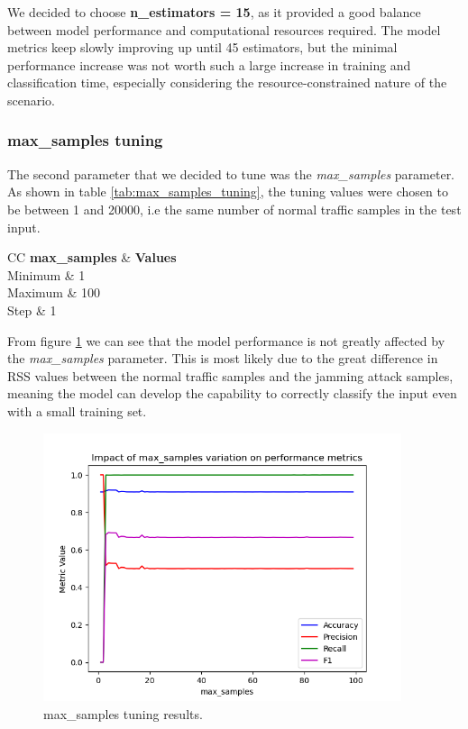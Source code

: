 \documentclass[futureinternet,article,submit,pdftex,moreauthors]{Definitions/mdpi}
\begin{document}
We decided to choose \textbf{n\_estimators = 15}, as it provided a good balance between model performance and computational resources required.
The model metrics keep slowly improving up until 45 estimators, but the minimal performance increase was not worth such a large increase in training and classification time, especially considering the resource-constrained nature of the scenario. 

\subsubsection{max\_samples tuning}

The second parameter that we decided to tune was the \textit{max\_samples} parameter. As shown in table \ref{tab:max_samples_tuning}, the tuning values were chosen to be between 1 and 20000, i.e the same number of normal traffic samples in the test input. 

\begin{table}[H]
	\caption{max\_samples tuning values.}\label{tab:max_samples_tuning}
	\begin{tabularx}{\textwidth}{CC}
	\toprule
	\textbf{max\_samples} & \textbf{Values} \\
	\midrule
	Minimum & 1 \\
	Maximum & 100 \\
	Step & 1 \\
	\bottomrule
\end{tabularx}
\end{table}

From figure \ref{fig:max_samples_tuning} we can see that the model performance is not greatly affected by the \textit{max\_samples} parameter. This is most likely due to the great difference in RSS values between the normal traffic samples and the jamming attack samples, meaning the model can develop the capability to correctly classify the input even with a small training set.

\begin{figure}[H]
	\includegraphics[width=10.5cm]{img/maxSamplesTuning.png}
	\caption{max\_samples tuning results.}\label{fig:max_samples_tuning}
\end{figure}
\unskip
\end{document}
